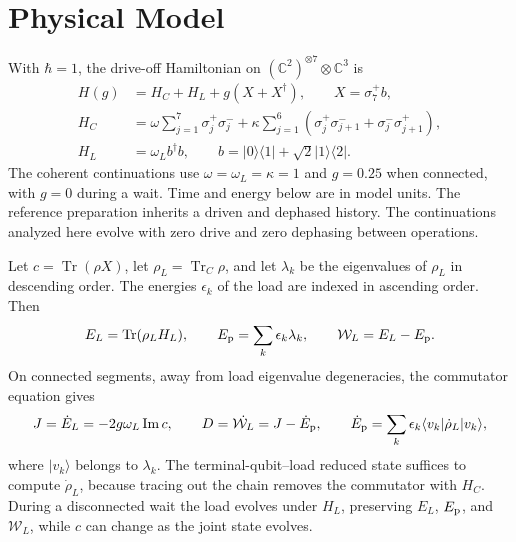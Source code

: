 \documentclass[11pt,a4paper]{article}
\DeclareMathOperator{\Tr}{Tr}
\newcommand{\Wp}{\mathcal W_L}
\begin{document}
\section{Physical Model}
\label{sec:model}

With $\hbar=1$, the drive-off Hamiltonian on $(\mathbb C^2)^{\otimes 7}\otimes\mathbb C^3$ is
\begin{align}
H(g) &= H_C + H_L + g(X+X^\dagger), \qquad X=\sigma_7^+ b,\\
H_C &= \omega\sum_{j=1}^{7}\sigma_j^+\sigma_j^-
   +\kappa\sum_{j=1}^{6}(\sigma_j^+\sigma_{j+1}^-+\sigma_j^-\sigma_{j+1}^+),\\
H_L &= \omega_L b^\dagger b, \qquad b=|0\rangle\langle1|+\sqrt{2}|1\rangle\langle2|.
\end{align}
The coherent continuations use $\omega=\omega_L=\kappa=1$ and $g=0.25$ when connected, with $g=0$ during a wait. Time and energy below are in model units. The reference preparation inherits a driven and dephased history. The continuations analyzed here evolve with zero drive and zero dephasing between operations.

Let $c=\Tr(\rho X)$, let $\rho_L=\Tr_C\rho$, and let $\lambda_k$ be the eigenvalues of $\rho_L$ in descending order. The energies $\epsilon_k$ of the load are indexed in ascending order. Then
\begin{equation}
 E_L=\Tr(\rho_L H_L), \qquad E_{\rm p}=\sum_k\epsilon_k\lambda_k, \qquad \Wp=E_L-E_{\rm p}.
\end{equation}
On connected segments, away from load eigenvalue degeneracies, the commutator equation gives
\begin{equation}
 J=\dot E_L=-2g\omega_L\operatorname{Im}c,\qquad
 D=\dot{\Wp}=J-\dot E_{\rm p},\qquad
 \dot E_{\rm p}=\sum_k\epsilon_k\langle v_k|\dot\rho_L|v_k\rangle,
 \label{eq:rate}
\end{equation}
where $|v_k\rangle$ belongs to $\lambda_k$. The terminal-qubit--load reduced state suffices to compute $\dot\rho_L$, because tracing out the chain removes the commutator with $H_C$. During a disconnected wait the load evolves under $H_L$, preserving $E_L$, $E_{\rm p}$, and $\Wp$, while $c$ can change as the joint state evolves.
\end{document}
